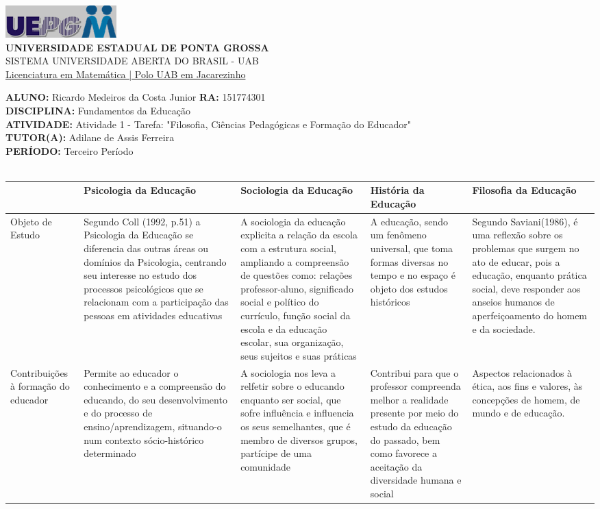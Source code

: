 \documentclass[a4paper, 12pt]{article}
\begin{document}
\begin{flushleft}\includegraphics{logo}\\
\textbf{UNIVERSIDADE ESTADUAL DE PONTA GROSSA} \\
SISTEMA UNIVERSIDADE ABERTA DO BRASIL - UAB \\
\underline{Licenciatura em Matemática | Polo UAB em Jacarezinho}\end{flushleft} 
\textbf{ALUNO:} Ricardo Medeiros da Costa Junior   \textbf{RA:} 151774301 \\
\textbf{DISCIPLINA:} Fundamentos da Educação \\
\textbf{ATIVIDADE:} Atividade 1 - Tarefa: "Filosofia, Ciências Pedagógicas e Formação do Educador" \\
\textbf{TUTOR(A):} Adilane de Assis Ferreira\\
\textbf{PERÍODO:} Terceiro Período \\ \\
    \begin{tabular}{|m{2.5cm}|m{3cm}|m{3cm}|m{3cm}|m{3cm}|}
      \hline
       & Psicologia da Educação & Sociologia da Educação & História da Educação & Filosofia da Educação\\
      \hline
      Objeto de Estudo & Segundo Coll (1992, p.51) a Psicologia da Educação se diferencia das outras áreas ou domínios da Psicologia, centrando seu interesse no estudo dos processos psicológicos que se relacionam com a participação das pessoas em atividades educativas & A sociologia da educação explicita a relação da escola com a estrutura social, ampliando a compreensão de questões como: relações professor-aluno, significado social e político do currículo, função social da escola e da educação escolar, sua organização, seus sujeitos e suas práticas & A educação, sendo um fenômeno universal, que toma formas diversas no tempo e no espaço é objeto dos estudos históricos & Segundo Saviani(1986), é uma reflexão sobre os problemas que surgem no ato de educar, pois a educação, enquanto prática social, deve responder aos anseios humanos de aperfeiçoamento do homem e da sociedade. \\
      \hline
      Contribuições à formação do educador & Permite ao educador o conhecimento e a compreensão do educando, do seu desenvolvimento e do processo de ensino/aprendizagem, situando-o num contexto sócio-histórico determinado & A sociologia nos leva a relfetir sobre o educando enquanto ser social, que sofre influência e influencia os seus semelhantes, que é membro de diversos grupos, partícipe de uma comunidade & Contribui para que o professor compreenda melhor a realidade presente por meio do estudo da educação do passado, bem como favorece a aceitação da diversidade humana e social & Aspectos relacionados à ética, aos fins e valores, às concepções de homem, de mundo e de educação.
      \hline
    \end{tabular}
\end{document}
